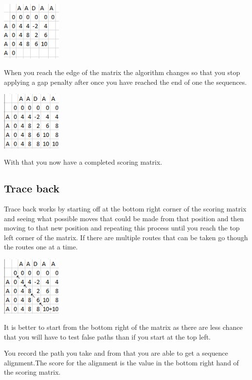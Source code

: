 \documentclass{cmppgr}
\begin{document}
\begin{enumerate}
		\includegraphics[width=3cm]{thirdNormal.png}

		When you reach the edge of the matrix the algorithm changes so that you stop applying a gap penalty after once you have reached the end of one the sequences.
	
		\includegraphics[width=3cm]{forthNormal.png}
		 
		 With that you now have a completed scoring matrix.
		
	\end{enumerate}
	
	\subsection{Trace back}
		Trace back works by starting off at the bottom right corner of the scoring matrix and seeing what possible moves that could be made from that position and then moving to that new position and repeating this process until you reach the top left corner of the matrix. If there are multiple routes that can be taken go though the routes one at a time.
		
		\includegraphics[width=3cm]{traceback.png}
		
		It is better to start from the bottom right of the matrix as there are less chance that you will have to test false paths than if you start at the top left.  
		
		You record the path you take and from that you are able to get a sequence alignment.The score for the alignment is the value in the bottom right hand of the scoring matrix.
	
\end{document}
